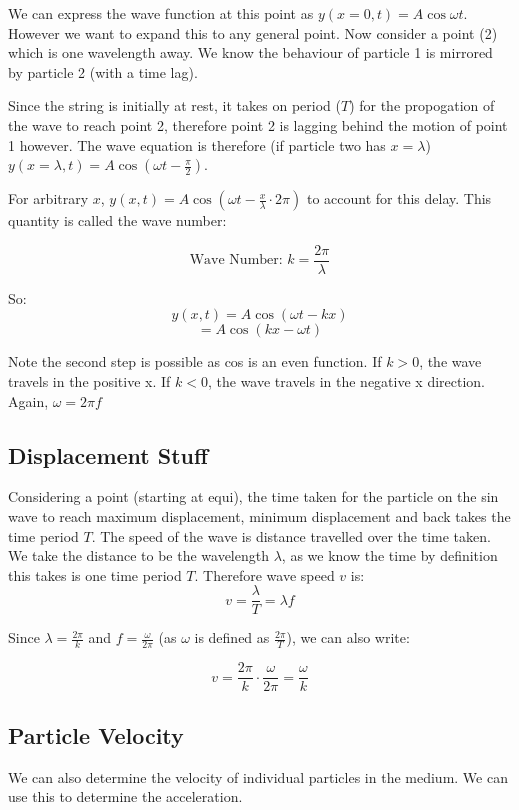 We can express the wave function at this point as $y(x = 0, t) = A \cos \omega t$. However we want to expand this to any general point. Now consider a point (2) which is one wavelength away. We know the behaviour of particle 1 is mirrored by particle 2 (with a time lag).

Since the string is initially at rest, it takes on period ($T$) for the propogation of the wave to reach point 2, therefore point 2 is lagging behind the motion of point 1 however. The wave equation is therefore (if particle two has $x = \lambda$) $y(x = \lambda, t) = A \cos (\omega t - \frac{\pi}{2})$. 

For arbitrary $x$, $y(x, t) = A \cos(\omega t - \frac{x}{\lambda}\cdot 2 \pi)$ to account for this delay. This quantity is called the wave number:

\[
    \text{Wave Number: } k = \frac{2 \pi}{\lambda}
\]

So:
\[
    y(x,t) = A \cos(\omega t - k x)
\]
\[
    = A \cos(kx - \omega t)
\]

Note the second step is possible as cos is an even function. If $k > 0$, the wave travels in the positive x. If $k < 0$, the wave travels in the negative x direction. Again, $\omega = 2 \pi f$

\subsection*{Displacement Stuff}
Considering a point (starting at equi), the time taken for the particle on the sin wave to reach maximum displacement, minimum displacement and back takes the time period $T$. The speed of the wave is distance travelled over the time taken. We take the distance to be the wavelength $\lambda$, as we know the time by definition this takes is one time period $T$. Therefore wave speed $v$ is:
\[
    v = \frac{\lambda}{T} = \lambda f
\]

Since $\lambda = \frac{2 \pi}{k}$ and $f = \frac{\omega}{2 \pi}$ (as $\omega$ is defined as $\frac{2 \pi}{T}$), we can also write:

\[
    v = \frac{2 \pi}{k} \cdot \frac{\omega}{2 \pi} = \frac{\omega}{k}
\]

\subsection*{Particle Velocity}
We can also determine the velocity of individual particles in the medium. We can use this to determine the acceleration.

